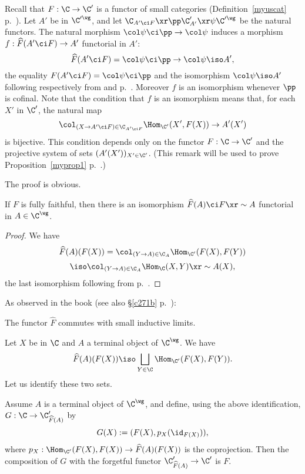 \documentclass[12pt]{article}
\theoremstyle{remark}
\theoremstyle{definition}
\begin{document}
\begin{rk}
Recall that $F:\C\to\C'$ is a functor of small categories (Definition~\ref{myuscat} p.~). Let $A'$ be in $\C'^\wg$, and let $\C_{A'\ci F}\xr\pp\C'_{A'}\xr\psi\C'^\wg$ be the natural functors. The natural morphism $\col\psi\ci\pp\to\col\psi$ induces a morphism $f:\widehat F(A'\ci F)\to A'$ functorial in $A'$: 
$$
\widehat F(A'\ci F)=\col\psi\ci\pp\to\col\psi\iso A',
$$ 
the equality $F(A'\ci F)=\col\psi\ci\pp$ and the isomorphism $\col\psi\iso A'$ following respectively from  and  p.~. Moreover $f$ is an isomorphism whenever $\pp$ is cofinal. Note that the condition that $f$ is an isomorphism means that, for each $X'$ in $\C'$, the natural map 
$$
\col_{(X\to A'\ci F)\in\C_{A'\ci F}}\Hom_{\C'}(X',F(X))\to A'(X')
$$ 
is bijective. This condition depends only on the functor $F:\C\to\C'$ and the projective system of sets $(A'(X'))_{X'\in\C'}$. (This remark will be used to prove Proposition~\ref{myprop1} p.~.)
\end{rk}

The proof is obvious.

\begin{rk}
If $F$ is fully faithful, then there is an isomorphism $\widehat F(A)\ci F\xr\sim A$ functorial in $A\in\C^\wg$.
\end{rk} 

\begin{proof}
We have 
$$
\widehat F(A)(F(X))=\col_{(Y\to A)\in\C_A}\Hom_{\C'}(F(X),F(Y))
$$
$$
\iso\col_{(Y\to A)\in\C_A}\Hom_\C(X,Y)\xr\sim A(X),
$$
the last isomorphism following from  p.~.
\end{proof}

As observed in the book (see also \S\ref{c271b} p.~):

\begin{rk}
The functor $\widehat F$ commutes with small inductive limits.
\end{rk} 

Let $X$ be in $\C$ and $A$ a terminal object of $\C^\wg$. We have 
$$
\widehat F(A)(F(X))\iso\bigsqcup_{Y\in\C}\Hom_{\C'}(F(X),F(Y)).
$$ 
Let us identify these two sets. 

\begin{rk}
Assume $A$ is a terminal object of $\C^\wg$, and define, using the above identification, $G:\C\to\C'_{\widehat F(A)}$ by 
$$
G(X):=(F(X),p_X(\id_{F(X)})),
$$ 
where $p_X:\Hom_{\C'}(F(X),F(X))\to\widehat F(A)(F(X))$ is the coprojection. Then the composition of $G$ with the forgetful functor $\C'_{\widehat F(A)}\to\C'$ is $F$.
\end{rk} 
\end{document}
